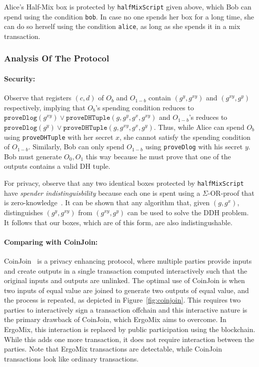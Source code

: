 \documentclass[11pt]{article}
\newcommand{\mixname}{ErgoMix\xspace}
\begin{document}
Alice's Half-Mix box is protected by \texttt{halfMixScript} given above, which Bob can spend using the condition \texttt{bob}. In case no one spends her box for a long time, she can do so herself using the condition \texttt{alice}, as long as she spends it in a mix transaction.  

\subsubsection{Analysis Of The Protocol}
\paragraph{Security:} Observe that registers $(c, d)$ of $O_b$ and $O_{1-b}$ contain $(g^y, g^{xy})$ and $(g^{xy}, g^y)$ respectively, implying that $O_b$'s  spending condition reduces to $\texttt{proveDlog}(g^{xy}) \lor \texttt{proveDHTuple}(g, g^y, g^x, g^{xy})$ and $O_{1-b}$'s reduces to $\texttt{proveDlog}(g^y) \lor \texttt{proveDHTuple}(g, g^{xy}, g^x, g^y)$. Thus, while Alice can spend $O_b$ using \texttt{proveDHTuple} with her secret $x$, she cannot satisfy the spending condition of $O_{1-b}$. Similarly, Bob can only spend $O_{1-b}$ using \texttt{proveDlog} with his secret $y$. Bob must generate $O_0, O_1$ this way because he must prove that one of the outputs contains a valid DH tuple.

For privacy, observe that any two identical boxes protected by \texttt{halfMixScript} have {\em spender indistinguisbility} because each one is spent using a $\Sigma$-OR-proof that is zero-knowledge~\cite{Dam10}. It can be shown that any algorithm that, given $(g, g^x)$, distinguishes $(g^y, g^{xy})$ from $(g^{xy}, g^y)$ can be used to solve the DDH problem. It follows that our boxes, which are of this form, are also indistingushable.

\paragraph{Comparing with CoinJoin:} CoinJoin~\cite{coinjoin} is a privacy enhancing protocol, where multiple parties provide inputs and create outputs in a single transaction computed interactively such that the original inputs and outputs are unlinked. The optimal use of CoinJoin is when two inputs of equal value are joined to generate two outputs of equal value, and the process is repeated, as depicted in Figure~\ref{fig:coinjoin}. 
This requires two parties to interactively sign a transaction offchain and this interactive nature is the primary drawback of CoinJoin, which \mixname aims to overcome. 
In \mixname, this interaction is replaced by public participation using the blockchain. While this adds one more transaction, it does not require interaction between the parties. Note that \mixname transactions are detectable, while CoinJoin transactions look like ordinary transactions. 
\end{document}
